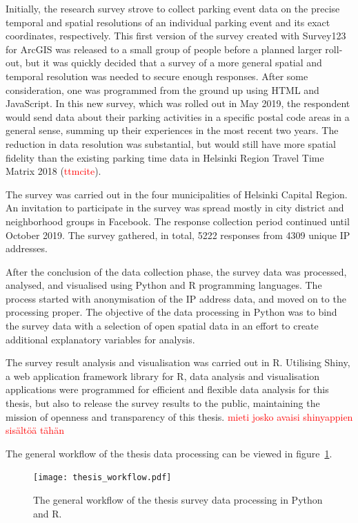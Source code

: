 Initially, the research survey strove to collect parking event data on the precise temporal and spatial resolutions of an individual parking event and its exact coordinates, respectively. This first version of the survey created with Survey123 for ArcGIS was released to a small group of people before a planned larger roll-out, but it was quickly decided that a survey of a more general spatial and temporal resolution was needed to secure enough responses. After some consideration, one was programmed from the ground up using HTML and JavaScript. In this new survey, which was rolled out in May 2019, the respondent would send data about their parking activities in a specific postal code areas in a general sense, summing up their experiences in the most recent two years. The reduction in data resolution was substantial, but would still have more spatial fidelity than the existing parking time data in Helsinki Region Travel Time Matrix 2018 (\textcolor{red}{ttmcite}).

The survey was carried out in the four municipalities of Helsinki Capital Region. An invitation to participate in the survey was spread mostly in city district and neighborhood groups in Facebook. The response collection period continued until October 2019. The survey gathered, in total, 5222 responses from 4309 unique IP addresses.

After the conclusion of the data collection phase, the survey data was processed, analysed, and visualised using Python and R programming languages. The process started with anonymisation of the IP address data, and moved on to the processing proper. The objective of the data processing in Python was to bind the survey data with a selection of open spatial data in an effort to create additional explanatory variables for analysis.

The survey result analysis and visualisation was carried out in R. Utilising Shiny, a web application framework library for R, data analysis and visualisation applications were programmed for efficient and flexible data analysis for this thesis, but also to release the survey results to the public, maintaining the mission of openness and transparency of this thesis. \textcolor{red}{mieti josko avaisi shinyappien sisältöä tähän}

The general workflow of the thesis data processing can be viewed in figure~\ref{fig:gen_workflow}.

\begin{figure}[H]
    \centering
    \texttt{[image: thesis\_workflow.pdf]}
    \caption{The general workflow of the thesis survey data processing in Python and R.}
    \label{fig:gen_workflow}
\end{figure}
\pagebreak

